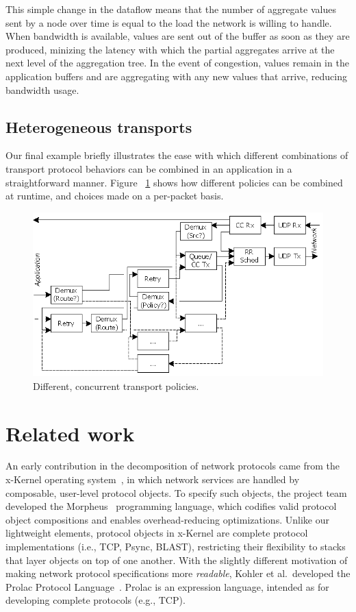 This simple change in the dataflow means that the number of aggregate
values sent by a node over time is equal to the load the network
is willing to handle.  When bandwidth is available, values are sent
out of the buffer as soon as they are produced, minizing the latency
with which the partial aggregates arrive at the next level of the
aggregation tree.  In the event of congestion, values remain in the
application buffers and are aggregating with any new values that
arrive, reducing bandwidth usage. 

\subsection{Heterogeneous transports}

Our final example briefly illustrates the ease with which different
combinations of transport protocol behaviors can be combined in an
application in a straightforward manner.  Figure
~\ref{fig:Classification} shows how different policies can be combined
at runtime, and choices made on a per-packet basis. 

\begin{figure}
\centerline{\includegraphics{transport/Classification}}
\caption{Different, concurrent transport policies.}
\label{fig:Classification}
\end{figure}

\section{Related work}
\label{sec:related}

An early contribution in the decomposition of network protocols came
from the x-Kernel operating system~\cite{x-kernel}, in which network
services are handled by composable, user-level protocol objects. To
specify such objects, the project team developed the Morpheus~\cite{Morpheus}
programming language, which codifies valid protocol object compositions
and enables overhead-reducing optimizations.  Unlike our lightweight
elements, protocol objects in x-Kernel are complete protocol
implementations (i.e., TCP, Psync, BLAST), restricting their flexibility
to stacks that layer objects on top of one another.
With the slightly different motivation of making network protocol specifications more
\emph{readable}, Kohler et al.\ developed the Prolac Protocol
Language~\cite{prolac}. Prolac is an expression language, intended as for developing
complete protocols (e.g., TCP).

